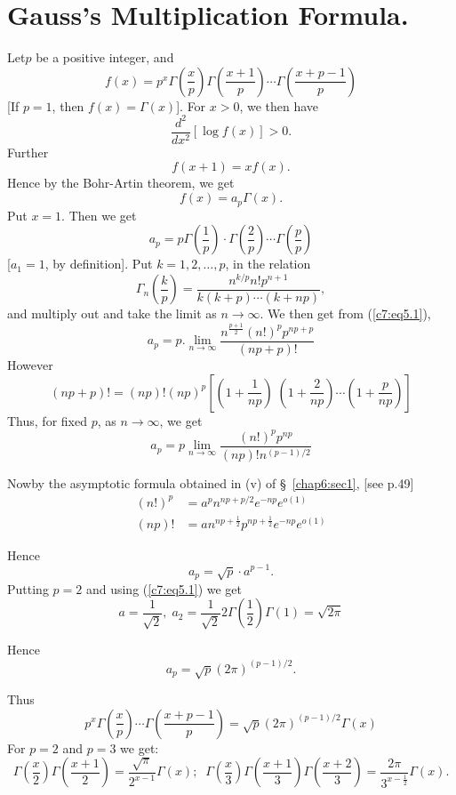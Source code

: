 \section[Gauss's Multiplication Formula]{Gauss's Multiplication Formula. \cite[Bd.I, p.281]{key7}}\label{chap7:sec5}

Let\pageoriginale  $p$ be a positive integer, and 
$$
f(x) = p^x \Gamma \left(\frac{x}{p} \right) \Gamma \left(\frac{x+1}{p}
\right) \cdots \Gamma \left( \frac{x+p-1}{p}\right)
$$
[If $p=1$, then $f(x) = \Gamma(x)$]. For $x>0$, we then have 
$$
\frac{d^2}{dx^2} [\log f(x)] > 0.
$$
Further 
$$
f(x+1) = xf(x).
$$
Hence by the Bohr-Artin theorem, we get
$$
f(x) = a_p \Gamma(x).
$$
Put $x=1$. Then we get
\begin{equation*}
a_p = p \Gamma \left(\frac{1}{p} \right) \cdot \Gamma
\left(\frac{2}{p} \right) \cdots \Gamma \left(\frac{p}{p} \right)
\tag{5.1}\label{c7:eq5.1}
\end{equation*}
[$a_1 = 1$, by definition]. Put $k = 1, 2, \ldots, p$, in the relation
$$
\Gamma_n \left( \frac{k}{p}\right) = \frac{n^{k/p} n! p^{n+1}}{k(k+p)
  \cdots (k+np)},
$$
and multiply out and take the limit as $n \to \infty$. We then get
from (\ref{c7:eq5.1}),
$$
a_p = p. \lim\limits_{n\to\infty} \frac{n^{\frac{p+1}{2}} (n!)^p p^{np+p}}{(np+p)!}
$$
However
$$
(np+p)! = (np)! (np)^p \left[\left(1+\frac{1}{np} \right) \;
  \left(1+\frac{2}{np}  \right)  \cdots \left(
  1+\frac{p}{np}\right)\right]  
$$
Thus, for fixed $p$, as $n \to \infty$, we get
$$
a_p = p \lim\limits_{n \to \infty} \frac{(n!)^p p^{np}}{(np)!
  n^{(p-1)/2}} 
$$

Now\pageoriginale by the asymptotic formula obtained in (v) of \S\ \ref{chap6:sec1},
[see p.49]
\begin{align*}
(n!)^p & = a^p n^{np+p/2} e^{-np} e^{o(1)}\\
(np)! & = a n^{np+\frac{1}{2}} p^{np+\frac{1}{2}} e^{-np}e^{o(1)}
\end{align*}

Hence
$$
a_p = \sqrt{p} \cdot a^{p-1}.
$$
Putting $p=2$ and using (\ref{c7:eq5.1}) we get
\begin{equation*}
a = \frac{1}{\sqrt{2}} , \; a_2 = \frac{1}{\sqrt{2}} 2 \Gamma
\left(\frac{1}{2} \right) \Gamma (1) = \sqrt{2\pi} \tag{5.2}\label{c7:eq5.2}
\end{equation*}

Hence
$$
a_p = \sqrt{p} (2\pi)^{(p-1)/2}. 
$$

Thus
$$
p^x \Gamma \left( \frac{x}{p}\right) \cdots \Gamma \left(
\frac{x+p-1}{p}\right) = \sqrt{p} (2\pi)^{(p-1)/2} \Gamma(x)
$$
For $p=2$ and $p=3$ we get:
$$  
\Gamma \left(\frac{x}{2} \right) \Gamma \left(\frac{x+1}{2} \right) =
\frac{\sqrt{\pi}}{2^{x-1}}  \Gamma(x) ;\;\; \Gamma \left(\frac{x}{3}
\right) \Gamma \left(\frac{x+1}{3} \right) \Gamma \left(\frac{x+2}{3}
\right)  = \frac{2\pi}{3^{x-\frac{1}{2}}} \Gamma (x).
$$

